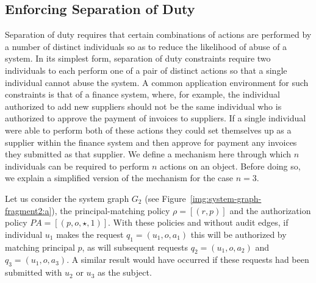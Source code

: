 \documentclass{article}
\newcommand{\pa}{\mathit{PA}}
\begin{document}
\subsection{Enforcing Separation of Duty}\label{sec:audit:sod}
Separation of duty requires that certain combinations of actions are performed by a number of distinct individuals so as to reduce the likelihood of abuse of a system.
In its simplest form, separation of duty constraints require two individuals to each perform one of a pair of distinct actions so that a single individual cannot abuse the system.
A common application environment for such constraints is that of a finance system, where, for example, the individual authorized to add new suppliers should not be the same individual who is authorized to approve the payment of invoices to suppliers.
If a single individual were able to perform both of these actions they could set themselves up as a supplier within the finance system and then approve for payment any invoices they submitted as that supplier.
We define a mechanism here through which $n$ individuals can be required to perform $n$ actions on an object.
Before doing so, we explain a simplified version of the mechanism for the case $n = 3$.

Let us consider the system graph $G_2$ (see Figure~\ref{img:system-graph-fragment2:a}), the principal-matching policy $\rho =  [(r, p)]$ and the authorization policy $\pa = [(p,o,\star,1)]$.
With these policies and without audit edges, if individual $u_1$ makes the request $q_1 = (u_1,o,a_1)$ this will be authorized by matching principal $p$, as will subsequent requests $q_2 = (u_1,o,a_2)$ and $q_3 = (u_1,o,a_3)$.
A similar result would have occurred if these requests had been submitted with $u_2$ or $u_3$ as the subject.
\end{document}

